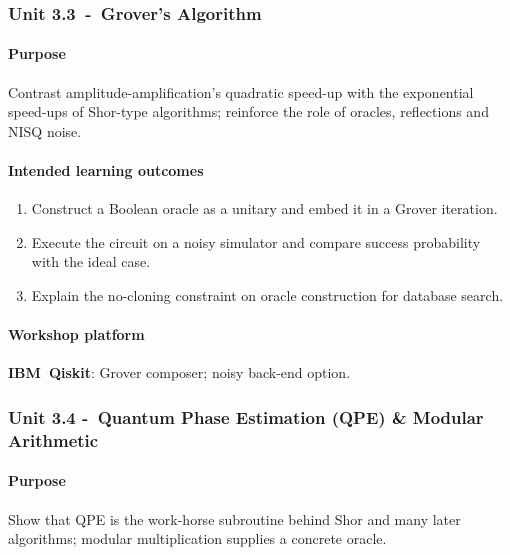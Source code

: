 \subsubsection*{Unit 3.3 - Grover’s Algorithm}

\paragraph{Purpose}
Contrast amplitude-amplification’s quadratic speed-up with the exponential speed-ups of Shor-type algorithms; 
reinforce the role of oracles, reflections and NISQ noise.

\paragraph{Intended learning outcomes}
\begin{enumerate}[label=3.3-\alph*]
	\item Construct a Boolean oracle as a unitary and embed it in a Grover iteration.                                                   
	\item Execute the circuit on a noisy simulator and compare success probability with the ideal case.                             
	\item Explain the no-cloning constraint on oracle construction for database search.                                             
\end{enumerate}

\paragraph{Workshop platform}
\textbf{IBM Qiskit}: Grover composer; noisy back-end option.

\subsubsection*{Unit 3.4 - Quantum Phase Estimation (QPE) \& Modular Arithmetic}

\paragraph{Purpose}
Show that QPE is the work-horse subroutine behind Shor and many later algorithms; 
modular multiplication supplies a concrete oracle.

